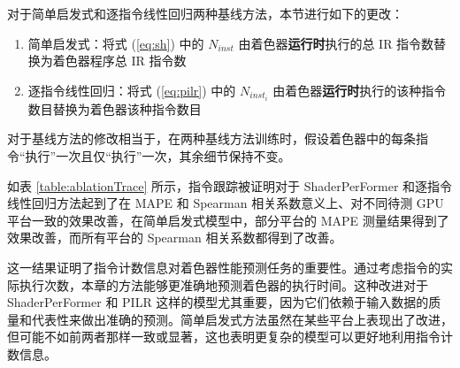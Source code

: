 对于简单启发式和逐指令线性回归两种基线方法，{\amend 本节}进行如下的更改：
\begin{enumerate}
    \item 简单启发式：将式 (\ref{eq:sh}) 中的 $N_{inst}$ 由着色器\textbf{运行时}执行的总 IR 指令数替换为着色器程序总 IR 指令数
    \item 逐指令线性回归：将式 (\ref{eq:pilr}) 中的 $N_{inst_i}$ 由着色器\textbf{运行时}执行的该种指令数目替换为着色器该种指令数目
\end{enumerate}

对于基线方法的修改相当于，在两种基线方法训练时，假设着色器中的每条指令“执行”一次且仅“执行”一次，其余细节保持不变。

如表 \ref{table:ablationTrace} 所示，指令跟踪被证明对于 ShaderPerFormer 和逐指令线性回归方法起到了在 MAPE 和 Spearman 相关系数意义上、对不同待测 GPU 平台一致的效果改善，在简单启发式模型中，部分平台的 MAPE 测量结果得到了效果改善，而所有平台的 Spearman 相关系数都得到了改善。

这一结果证明了指令计数信息对着色器性能预测任务的重要性。通过考虑指令的实际执行次数，{\amend 本章的}方法能够更准确地预测着色器的执行时间。这种改进对于ShaderPerFormer 和 PILR 这样{\amend 的}模型尤其重要，因为它们依赖于输入数据的质量和代表性来做出准确的预测。简单启发式方法虽然在某些平台上表现出了改进，但可能不如前两者那样一致或显著，这也表明更复杂的模型可以更好地利用指令计数信息。

